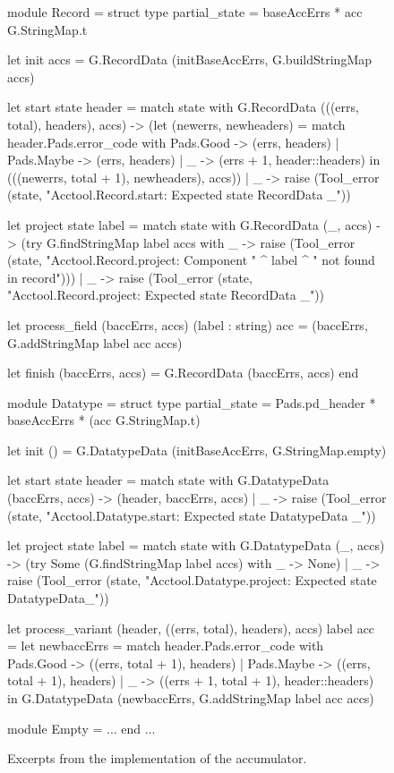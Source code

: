 \begin{figure}
\begin{code}\scriptsize
module Record = struct
  type partial_state = baseAccErrs * acc G.StringMap.t
	
  let init accs = G.RecordData (initBaseAccErrs, G.buildStringMap accs)
      
  let start state header =
    match state with
      G.RecordData (((errs, total), headers), accs) ->
	(let (newerrs, newheaders) =
	  match header.Pads.error_code with
	    Pads.Good -> (errs, headers)
	  | Pads.Maybe -> (errs, headers)
	  | _ -> (errs + 1, header::headers)
	in (((newerrs, total + 1), newheaders), accs))
    | _ -> raise (Tool_error (state, "Acctool.Record.start: Expected state RecordData _"))
	  
  let project state label =
    match state with
      G.RecordData (_, accs) ->
	(try G.findStringMap label accs
	with _ -> raise (Tool_error (state, "Acctool.Record.project: Component " 
				     ^ label ^ " not found in record")))
    | _ -> raise (Tool_error (state, "Acctool.Record.project: Expected state RecordData _"))

  let process_field (baccErrs, accs) (label : string) acc =
    (baccErrs, G.addStringMap label acc accs)
      
  let finish (baccErrs, accs) =
    G.RecordData (baccErrs, accs)
end
    
module Datatype = struct
  type partial_state = Pads.pd_header * baseAccErrs * (acc G.StringMap.t)
	
  let init () = 
    G.DatatypeData (initBaseAccErrs, G.StringMap.empty)

  let start state header =
    match state with
      G.DatatypeData (baccErrs, accs) -> (header, baccErrs, accs)
    | _ -> raise (Tool_error (state, "Acctool.Datatype.start: Expected state DatatypeData _"))
	  
  let project state label =
    match state with
      G.DatatypeData (_, accs) ->
	(try Some (G.findStringMap label accs)
	with _ -> None)
    | _ -> raise (Tool_error (state, "Acctool.Datatype.project: Expected state DatatypeData_"))
	  
  let process_variant (header, ((errs, total), headers), accs) label acc =
    let newbaccErrs =
      match header.Pads.error_code with
	Pads.Good -> ((errs, total + 1), headers)
      | Pads.Maybe -> ((errs, total + 1), headers)
      | _ -> ((errs + 1, total + 1), header::headers)
    in
    G.DatatypeData (newbaccErrs, G.addStringMap label acc accs)
      
  module Empty = ...
end
...
\end{code}
\caption{Excerpts from the implementation of the accumulator.}
\label{fig:gentool-accum-code}
\end{figure}

